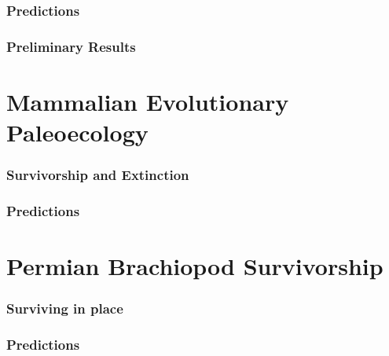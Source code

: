 \documentclass{beamer}
\begin{document}
\begin{frame}
  \frametitle{Predictions}

\end{frame}

\begin{frame}
  \frametitle{Preliminary Results}

\end{frame}


\section{Mammalian Evolutionary Paleoecology}
\begin{frame}
  \frametitle{Survivorship and Extinction}

\end{frame}

\begin{frame}
  \frametitle{Predictions}

\end{frame}


\section{Permian Brachiopod Survivorship}
\begin{frame}
  \frametitle{Surviving in place}

\end{frame}

\begin{frame}
  \frametitle{Predictions}

\end{frame}
\end{document}
